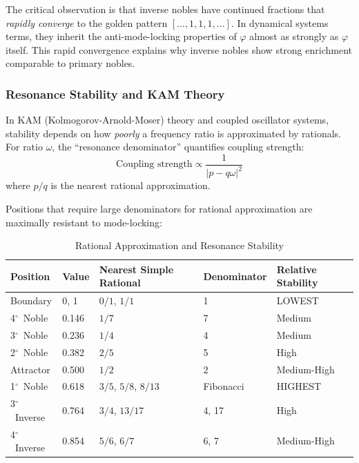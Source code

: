 \documentclass[11pt,a4paper]{article}
\newcommand{\degree}{$^\circ$}  %
\newcommand{\phisym}{\varphi}
\begin{document}
The critical observation is that inverse nobles have continued fractions that \textit{rapidly converge} to the golden pattern $[..., 1, 1, 1, ...]$. In dynamical systems terms, they inherit the anti-mode-locking properties of $\phisym$ almost as strongly as $\phisym$ itself. This rapid convergence explains why inverse nobles show strong enrichment comparable to primary nobles.

\subsubsection{Resonance Stability and KAM Theory}
\label{sec:kam_theory}

In KAM (Kolmogorov-Arnold-Moser) theory and coupled oscillator systems, stability depends on how \textit{poorly} a frequency ratio is approximated by rationals. For ratio $\omega$, the ``resonance denominator'' quantifies coupling strength:
\begin{equation}
\text{Coupling strength} \propto \frac{1}{|p - q\omega|^2}
\end{equation}
where $p/q$ is the nearest rational approximation.

Positions that require large denominators for rational approximation are maximally resistant to mode-locking:

\begin{table}[H]
\centering
\caption{Rational Approximation and Resonance Stability}
\label{tab:resonance_stability}
\begin{tabular}{@{}lllll@{}}
\toprule
Position & Value & Nearest Simple Rational & Denominator & Relative Stability \\
\midrule
Boundary & 0, 1 & $0/1$, $1/1$ & 1 & LOWEST \\
4\degree\ Noble & 0.146 & $1/7$ & 7 & Medium \\
3\degree\ Noble & 0.236 & $1/4$ & 4 & Medium \\
2\degree\ Noble & 0.382 & $2/5$ & 5 & High \\
Attractor & 0.500 & $1/2$ & 2 & Medium-High \\
1\degree\ Noble & 0.618 & $3/5$, $5/8$, $8/13$ & Fibonacci & HIGHEST \\
3\degree\ Inverse & 0.764 & $3/4$, $13/17$ & 4, 17 & High \\
4\degree\ Inverse & 0.854 & $5/6$, $6/7$ & 6, 7 & Medium-High \\
\bottomrule
\end{tabular}
\end{table}
\end{document}
